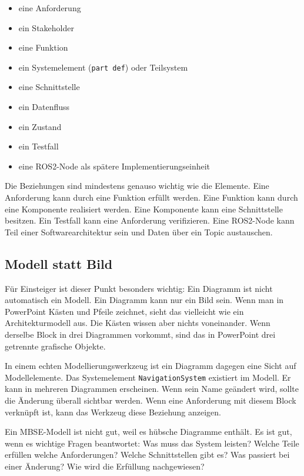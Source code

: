 \begin{itemize}
    \item eine Anforderung
    \item ein Stakeholder
    \item eine Funktion
    \item ein Systemelement (\texttt{part def}) oder Teilsystem
    \item eine Schnittstelle
    \item ein Datenfluss
    \item ein Zustand
    \item ein Testfall
    \item eine ROS2-Node als spätere Implementierungseinheit
\end{itemize}

Die Beziehungen sind mindestens genauso wichtig wie die Elemente. Eine Anforderung kann durch eine Funktion erfüllt werden. Eine Funktion kann durch eine Komponente realisiert werden. Eine Komponente kann eine Schnittstelle besitzen. Ein Testfall kann eine Anforderung verifizieren. Eine ROS2-Node kann Teil einer Softwarearchitektur sein und Daten über ein Topic austauschen.

\subsection{Modell statt Bild}
Für Einsteiger ist dieser Punkt besonders wichtig: Ein Diagramm ist nicht automatisch ein Modell. Ein Diagramm kann nur ein Bild sein. Wenn man in PowerPoint Kästen und Pfeile zeichnet, sieht das vielleicht wie ein Architekturmodell aus. Die Kästen wissen aber nichts voneinander. Wenn derselbe Block in drei Diagrammen vorkommt, sind das in PowerPoint drei getrennte grafische Objekte.

In einem echten Modellierungswerkzeug ist ein Diagramm dagegen eine Sicht auf Modellelemente. Das Systemelement \texttt{NavigationSystem} existiert im Modell. Er kann in mehreren Diagrammen erscheinen. Wenn sein Name geändert wird, sollte die Änderung überall sichtbar werden. Wenn eine Anforderung mit diesem Block verknüpft ist, kann das Werkzeug diese Beziehung anzeigen.

\begin{hinweisbox}
Ein MBSE-Modell ist nicht gut, weil es hübsche Diagramme enthält. Es ist gut, wenn es wichtige Fragen beantwortet: Was muss das System leisten? Welche Teile erfüllen welche Anforderungen? Welche Schnittstellen gibt es? Was passiert bei einer Änderung? Wie wird die Erfüllung nachgewiesen?
\end{hinweisbox}

